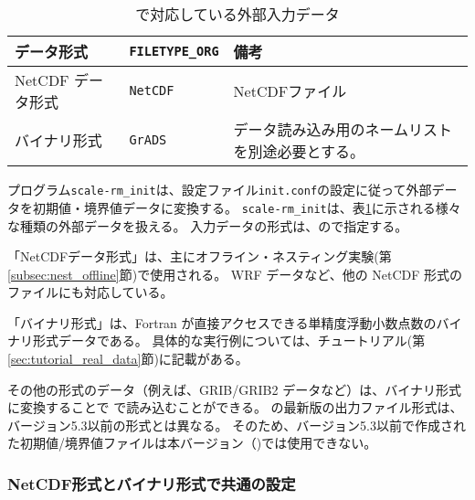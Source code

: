 \section{\SecInputDataSetting} \label{sec:adv_datainput}

\begin{table}[htb]
\begin{center}
\caption{\scalelib で対応している外部入力データ}
\begin{tabularx}{150mm}{|l|l|X|} \hline
 \rowcolor[gray]{0.9} データ形式      & \verb|FILETYPE_ORG|  & 備考 \\ \hline
 NetCDF データ形式   & \verb|NetCDF|     &  NetCDFファイル \\ \hline
 バイナリ形式 & \verb|GrADS|        & データ読み込み用のネームリストを別途必要とする。       \\ \hline
\end{tabularx}
\label{tab:inputdata_format}
\end{center}
\end{table}

プログラム\verb|scale-rm_init|は、設定ファイル\verb|init.conf|の設定に従って外部データを初期値・境界値データに変換する。
\verb|scale-rm_init|は、表\ref{tab:inputdata_format}に示される様々な種類の外部データを扱える。
入力データの形式は、ので指定する。

「NetCDFデータ形式」は、主にオフライン・ネスティング実験(第\ref{subsec:nest_offline}節)で使用される。
WRF データなど、他の NetCDF 形式のファイルにも対応している。


「バイナリ形式」は、Fortran が直接アクセスできる単精度浮動小数点数のバイナリ形式データである。
具体的な実行例については、チュートリアル(第\ref{sec:tutorial_real_data}節)に記載がある。


その他の形式のデータ（例えば、GRIB/GRIB2 データなど）は、バイナリ形式に変換することで {\scalerm} で読み込むことができる。
{\scalelib}の最新版の出力ファイル形式は、バージョン5.3以前の形式とは異なる。
そのため、バージョン5.3以前で作成された初期値/境界値ファイルは本バージョン（{\scalelib}{\version})では使用できない。

\subsubsection{NetCDF形式とバイナリ形式で共通の設定} \label{sec:datainput_common_setting}

